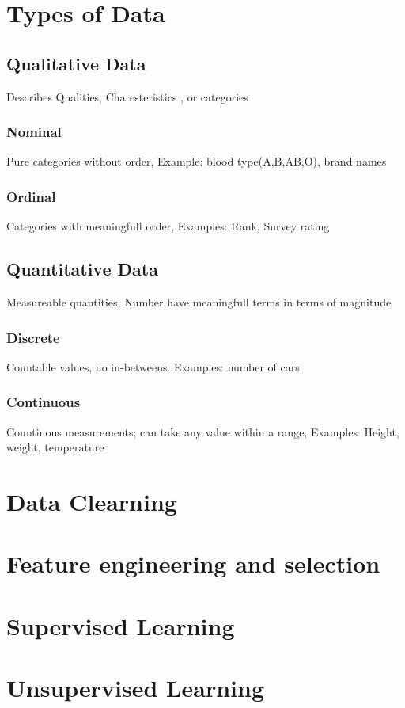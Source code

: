 \documentclass[12pt]{extarticle}
\begin{document}
\section{Types of Data}
\subsection{Qualitative Data}
Describes Qualities, Charesteristics , or categories
\subsubsection{Nominal}
Pure categories without order, 
Example: blood type(A,B,AB,O), brand names
\subsubsection{Ordinal}
Categories with meaningfull order,
Examples: Rank, Survey rating
\subsection{Quantitative Data}
Measureable quantities, Number have meaningfull terms in terms of magnitude
\subsubsection{Discrete}
Countable values, no in-betweens. 
Examples: number of cars
\subsubsection{Continuous}
Countinous measurements; can take any value within a range, 
Examples: Height, weight, temperature

\section{Data Clearning}





\section{Feature engineering and selection}


\section{Supervised Learning}
\section{Unsupervised Learning}
\end{document}
